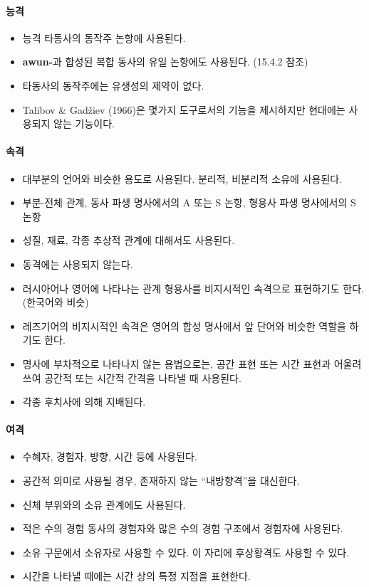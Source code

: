 \paragraph{능격}
\begin{itemize}
\item 능격 타동사의 동작주 논항에 사용된다.
\item \textbf{awun-}과 합성된 복합 동사의 유일 논항에도 사용된다. (15.4.2 참조)
\item 타동사의 동작주에는 유생성의 제약이 없다.
\item Talibov \& Gadžiev (1966)은 몇가지 도구로서의 기능을 제시하지만 현대에는 사용되지 않는 기능이다.
\end{itemize}
\paragraph{속격}
\begin{itemize}
\item 대부분의 언어와 비슷한 용도로 사용된다. 분리적, 비분리적 소유에 사용된다.
\item 부분-전체 관계, 동사 파생 명사에서의 A 또는 S 논항, 형용사 파생 명사에서의 S 논항
\item 성질, 재료, 각종 추상적 관계에 대해서도 사용된다.
\item 동격에는 사용되지 않는다.
\item 러시아어나 영어에 나타나는 관계 형용사를 비지시적인 속격으로 표현하기도 한다. (한국어와 비슷)
\item 레즈기어의 비지시적인 속격은 영어의 합성 명사에서 앞 단어와 비슷한 역할을 하기도 한다.
\item 명사에 부차적으로 나타나지 않는 용법으로는, 공간 표현 또는 시간 표현과 어울려 쓰여 공간적 또는 시간적 간격을 나타낼 때 사용된다.
\item 각종 후치사에 의해 지배된다.
\end{itemize}
\paragraph{여격}
\begin{itemize}
\item 수혜자, 경험자, 방향, 시간 등에 사용된다. 
\item 공간적 의미로 사용될 경우, 존재하지 않는 ``내방향격''을 대신한다.
\item 신체 부위와의 소유 관계에도 사용된다.
\item 적은 수의 경험 동사의 경험자와 많은 수의 경험 구조에서 경험자에 사용된다.
\item 소유 구문에서 소유자로 사용할 수 있다. 이 자리에 후상황격도 사용할 수 있다.
\item 시간을 나타낼 때에는 시간 상의 특정 지점을 표현한다.
\end{itemize}
